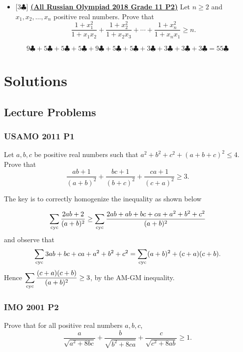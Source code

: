 \documentclass[12pt]{article}
\begin{document}
\begin{itemize}
	      \[ \left( a - 1 + \frac 1b \right) \left( b - 1 + \frac 1c \right) \left( c - 1 + \frac 1a \right) \leq 1.
	      \]
	\item [\texttt{\textcolor{color3}{18RUS112}}] \textcolor{color3}{[$3\clubsuit$]} \href{https://artofproblemsolving.com/community/c6h1634929p10278399}{\textbf{(All Russian Olympiad 2018 Grade 11 P2)}} Let $n\geq 2$ and $x_{1},x_{2},\ldots,x_{n}$ positive real numbers. Prove that
	      \[\frac{1+x_{1}^2}{1+x_{1}x_{2}}+\frac{1+x_{2}^2}{1+x_{2}x_{3}}+\cdots+\frac{1+x_{n}^2}{1+x_{n}x_{1}}\geq n.\]
\end{itemize}

\[
	9\clubsuit+5\clubsuit+5\clubsuit+5\clubsuit+9\clubsuit+5\clubsuit+5\clubsuit+3\clubsuit+3\clubsuit+3\clubsuit+3\clubsuit=55\clubsuit
\]

\clearpage

\section{\textsf{Solutions}}

\subsection{Lecture Problems}

\subsubsection{USAMO 2011 P1}
\begin{problem}
Let $a, b, c$ be positive real numbers such that $a^2+b^2+c^2+(a+b+c)^2\leq4$. Prove that
\[\frac{ab+1}{(a+b)^2}+\frac{bc+1}{(b+c)^2}+\frac{ca+1}{(c+a)^2}\geq 3.\]
\end{problem}

The key is to correctly homogenize the inequality as shown below

\[
	\sum_{\text{cyc}} \frac{2ab+2}{(a+b)^2} \geq \sum_{\text{cyc}} \frac{2ab+ab+bc+ca+a^2+b^2+c^2}{(a+b)^2}
\]
and observe that
\[
	\displaystyle \sum_{\text{cyc}} 3ab+bc+ca+a^2+b^2+c^2= \sum_{\text{cyc}} (a+b)^2 + (c+a)(c+b).
\]
Hence $\displaystyle \sum_{\text{cyc}} \frac{(c+a)(c+b)}{(a+b)^2} \geq 3$, by the AM-GM inequality.

\clearpage

\subsubsection{IMO 2001 P2}
\begin{problem}
Prove that for all positive real numbers $a,b,c$,\[ \frac{a}{\sqrt{a^2 + 8bc}} + \frac{b}
	{\sqrt{b^2 + 8ca}} + \frac{c}{\sqrt{c^2 + 8ab}} \geq 1.  \]
\end{problem}
\end{document}
